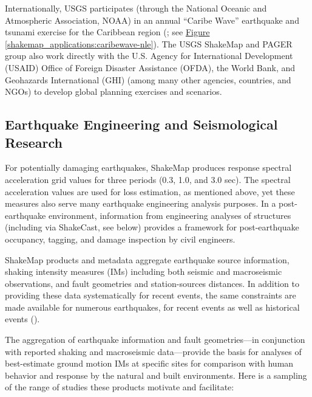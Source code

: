 \documentclass[letterpaper,10pt,english]{sphinxmanual}
\begin{document}
Internationally, USGS participates (through the National Oceanic and Atmospheric Association, NOAA) in an annual ``Caribe
Wave'' earthquake and tsunami exercise for the Caribbean region
({\hyperref[references:ioc2012]{}}; see \hyperref[shakemap_applications:caribewave-nle]{Figure  \ref*{shakemap_applications:caribewave-nle}}). The USGS ShakeMap and PAGER group also work directly with the U.S.
Agency for International Development (USAID) Office of Foreign
Disaster Assistance (OFDA), the World Bank, and Geohazards International (GHI) (among many other agencies, countries, and NGOs) to
develop global planning exercises and scenarios.


\subsection{Earthquake Engineering and Seismological Research}
\label{shakemap_applications:earthquake-engineering-and-seismological-research}
For potentially damaging earthquakes, ShakeMap produces response spectral
acceleration grid values for three periods (0.3, 1.0, and 3.0 sec). The
spectral acceleration values are used for loss estimation, as
mentioned above, yet these measures also serve many earthquake engineering analysis purposes. In a
post-earthquake environment, information from engineering analyses of structures
(including via ShakeCast, see below) provides a framework for post-earthquake
occupancy, tagging, and damage inspection by civil engineers.

ShakeMap products and metadata aggregate earthquake source
information, shaking intensity measures (IMs) including both seismic and macroseismic observations, and fault geometries and station-sources distances.
In addition to providing these data systematically for recent events,
the same constraints are made available for numerous earthquakes, for recent events
as well as historical events ({\hyperref[shakemap_archives:sec\string-shakemap\string-archives]{}}).

The aggregation of earthquake information and fault geometries---in
conjunction with reported shaking and macroseismic data---provide the
basis for analyses of best-estimate ground motion IMs at specific
sites for comparison with human behavior and response by the
natural and built environments. Here is a
sampling of the range of studies these products motivate and facilitate:
\end{document}
